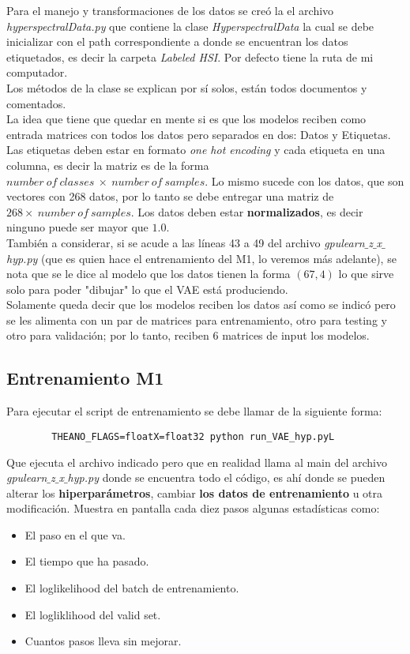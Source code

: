 \documentclass[letterpaper,11pt]{article} %
\begin{document}
	Para el manejo y transformaciones de los datos se creó la el archivo \textit{hyperspectralData.py} que contiene la clase \textit{HyperspectralData} la cual se debe inicializar con el path correspondiente a donde se encuentran los datos etiquetados, es decir la carpeta \textit{Labeled HSI}. Por defecto tiene la ruta de mi computador.\\
	Los métodos de la clase se explican por sí solos, están todos documentos y comentados.\\
	La idea que tiene que quedar en mente si es que los modelos reciben como entrada matrices con todos los datos pero separados en dos: Datos y Etiquetas. Las etiquetas deben estar en formato \textit{one hot encoding} y cada etiqueta en una columna, es decir la matriz es de la forma $number\ of\ classes\ \times\ number\ of\ samples$. Lo mismo sucede con los datos, que son vectores con 268 datos, por lo tanto se debe entregar una matriz de $268 \times\ number\ of\ samples$. Los datos deben estar \textbf{normalizados}, es decir ninguno puede ser mayor que $1.0$.\\
	También a considerar, si se acude a las líneas 43 a 49 del archivo \textit{gpulearn$\_$z$\_$x$\_$hyp.py} (que es quien hace el entrenamiento del M1, lo veremos más adelante), se nota que se le dice al modelo que los datos tienen la forma $(67,4)$ lo que sirve solo para poder "dibujar" lo que el VAE está produciendo.\\ 
	Solamente queda decir que los modelos reciben los datos así como se indicó pero se les alimenta con un par de matrices para entrenamiento, otro para testing y otro para validación; por lo tanto, reciben 6 matrices de input los modelos.

\subsection{Entrenamiento M1}

	Para ejecutar el script de entrenamiento se debe llamar de la siguiente forma:
	\begin{lstlisting}
		THEANO_FLAGS=floatX=float32 python run_VAE_hyp.pyL
	\end{lstlisting}
	Que ejecuta el archivo indicado pero que en realidad llama al main del archivo \textit{gpulearn$\_$z$\_$x$\_$hyp.py} donde se encuentra todo el código, es ahí donde se pueden alterar los \textbf{hiperparámetros}, cambiar \textbf{los datos de entrenamiento} u otra modificación.
	Muestra en pantalla cada diez pasos algunas estadísticas como:
	\begin{itemize}
		\item El paso en el que va.
		\item El tiempo que ha pasado.
		\item El loglikelihood del batch de entrenamiento.
		\item El logliklihood del valid set.
		\item Cuantos pasos lleva sin mejorar.
	\end{itemize}
\end{document}
